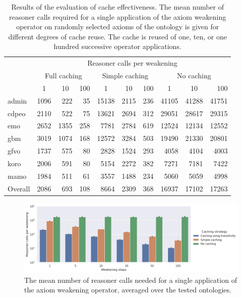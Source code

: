 \begin{table}[ht]
  \scriptsize
  \centering
  \begin{tabular}{|l|rrr|rrr|rrr|}
    \cline{2-10}
    \multicolumn{1}{l|}{} & \multicolumn{9}{c|}{\hspace{-4mm}Reasoner calls per weakening} \\
    \multicolumn{1}{l|}{} & \multicolumn{3}{c}{Full caching} & \multicolumn{3}{c}{Simple caching} & \multicolumn{3}{c|}{No caching} \\
    \multicolumn{1}{l|}{} & \multicolumn{1}{c}{1} & \multicolumn{1}{c}{10} & \multicolumn{1}{c}{100} & \multicolumn{1}{c}{1} & \multicolumn{1}{c}{10} & \multicolumn{1}{c}{100} & \multicolumn{1}{c}{1} & \multicolumn{1}{c}{10} & 100 \\
    \hline
    admin & 1096 & 222 & 35
      & 15138 & 2115 & 236
      & 41105 & 41288 & 41751 \\
    cdpeo & 2110 & 522 & 75
      & 13621 & 2694 & 312
      & 29051 & 28617 & 29315 \\
    emo & 2652 & 1355 & 258
      & 7781 & 2784 & 619
      & 12524 & 12134 & 12552 \\
    gbm & 3019 & 1074 & 168
      & 12572 & 3284 & 503
      & 19490 & 21330 & 20801 \\
    gfvo & 1737 & 575 & 80
      & 2828 & 1524 & 293
      & 4058 & 4104 & 4003 \\
    koro & 2006 & 591 & 80
      & 5154 & 2272 & 382
      & 7271 & 7181 & 7422 \\
    mamo &  1984 & 511 & 61
      & 3557 & 1488 & 234
      & 5060 & 5059 & 4998 \\
    \hline
    Overall & 2086 & 693 & 108
      & 8664 & 2309 & 368
      & 16937 & 17102 & 17263 \\
    \hline
  \end{tabular}
  \caption{Results of the evaluation of cache effectiveness. The mean number of reasoner calls required for a single application of the axiom weakening operator on randomly selected axioms of the ontology is given for different degrees of cache reuse. The cache is reused of one, ten, or one hundred successive operator applications.}
  \label{table:results-cache-calls}
\end{table}

\begin{figure}[ht]
  \centering
  \includegraphics[width=\textwidth]{resources/calls-cache-bar.png}
  \caption{The mean number of reasoner calls needed for a single application of the axiom weakening operator, averaged over the tested ontologies.}
  \label{fig:results-cache-calls}
\end{figure}

